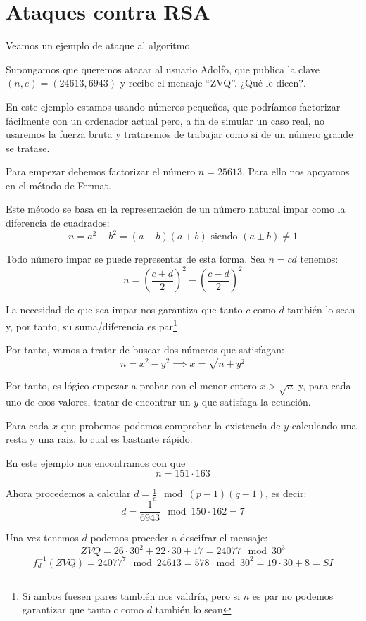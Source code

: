 \section{Ataques contra RSA}
Veamos un ejemplo de ataque al algoritmo.
\begin{example}
Supongamos que queremos atacar al usuario Adolfo, que publica la clave $(n,e) = (24613,6943)$ y recibe el mensaje ``ZVQ''. ¿Qué le dicen?.

\obs En este ejemplo estamos usando números pequeños, que podríamos factorizar fácilmente con un ordenador actual pero, a fin de simular un caso real, no usaremos la fuerza bruta y trataremos de trabajar como si de un número grande se tratase.

Para empezar debemos factorizar el número $n=25613$. Para ello nos apoyamos en el método de Fermat.

\begin{defn}
Este método se basa en la representación de un número natural impar como la diferencia de cuadrados:
\[n = a^2-b^2 = (a-b)(a+b) \text{ siendo } (a\pm b) \neq 1\]

\obs Todo número impar se puede representar de esta forma. Sea $n=cd$ tenemos:
\[n = \left( \frac{c+d}{2}\right)^2 - \left( \frac{c-d}{2}\right)^2\]

La necesidad de que sea impar nos garantiza que tanto $c$ como $d$ también lo sean y, por tanto, su suma/diferencia es par\footnote{Si ambos fuesen pares también nos valdría, pero si $n$ es par no podemos garantizar que tanto $c$ como $d$ también lo sean}
\end{defn}

Por tanto, vamos a tratar de buscar dos números que satisfagan:
\[n=x^2-y^2 \implies x = \sqrt{n+y^2}\]

Por tanto, es lógico empezar a probar con el menor entero $x>\sqrt{n}$ y, para cada uno de esos valores, tratar de encontrar un $y$ que satisfaga la ecuación.

Para cada $x$ que probemos podemos comprobar la existencia de $y$ calculando una resta y una raiz, lo cual es bastante rápido.

En este ejemplo nos encontramos con que
\[n = 151 \cdot 163\]

Ahora procedemos a calcular $d=\frac{1}{e} \mod (p-1)(q-1)$, es decir:
\[d = \frac{1}{6943} \mod 150 \cdot 162 = 7 \]

Una vez tenemos $d$ podemos proceder a descifrar el mensaje:
\[ZVQ = 26 \cdot 30^2+22 \cdot 30 +17 = 24077 \mod 30^3\]
\[f_d^{-1}(ZVQ) = 24077^7 \mod 24613 = 578 \mod 30^2 = 19\cdot 30 +8 = SI\]
\end{example}

